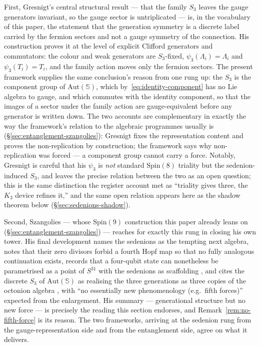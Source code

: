 First, Gresnigt's central structural result --- that the family $S_3$ leaves the gauge generators
invariant, so the gauge sector is untriplicated --- is, in the vocabulary of this paper, the
statement that the generation symmetry is a discrete label carried by the fermion sectors and not a
gauge symmetry of the connection. His construction proves it at the level of explicit Clifford
generators and commutators: the colour and weak generators are $S_3$-fixed, $\psi_3(\Lambda_i) =
\Lambda_i$ and $\psi_3(T_i) = T_i$, and the family action moves only the fermion sectors. The present
framework supplies the same conclusion's reason from one rung up: the $S_3$ is the component group of
$\mathrm{Aut}(\mathbb{S})$, which by~\eqref{eq:identity-component} has no Lie algebra to gauge, and
which commutes with the identity component, so that the images of a sector under the family action
are gauge-equivalent before any generator is written down. The
two accounts are complementary in exactly the way the framework's relation to the algebraic programmes
usually is (\S\ref{sec:entanglement-szangolies}): Gresnigt fixes the representation content and proves
the non-replication by construction; the framework says why non-replication was forced --- a component
group cannot carry a force. Notably, Gresnigt is careful that his $\psi_3$ is \emph{not} standard
$\mathrm{Spin}(8)$ triality but the sedenion-induced $S_3$, and leaves the precise relation between
the two as an open question; this is the same distinction the register account met as ``triality
gives three, the $K_3$ device refines it,'' and the same open relation appears here as the shadow
theorem below (\S\ref{sec:sedenions-shadow}).

Second, Szangolies --- whose $\mathrm{Spin}(9)$ construction this paper already leans on
(\S\ref{sec:entanglement-szangolies}) --- reaches for exactly this rung in closing his own tower. His
final development names the sedenions as the tempting next algebra, notes that their zero divisors
forbid a fourth Hopf map so that no fully analogous continuation exists, records that a four-qubit
state can nonetheless be parametrised as a point of $S^{31}$ with the sedenions as scaffolding
\autocite{pinillaluthra2009hopf}, and cites the discrete $S_3$ of $\mathrm{Aut}(\mathbb{S})$ as
realising the three generations as three copies of the octonion algebra
\autocite{gresnigtgourlayvarma2023three,gourlaygresnigt2024algebraic,tangtang2023unified}, with
``no essentially new phenomenology (e.g.\ fifth forces)'' expected from the enlargement. His summary
--- generational structure but no new force --- is precisely the reading this section endorses, and
Remark~\ref{rem:no-fifth-force} is its reason. The two frameworks, arriving at the sedenion rung from
the gauge-representation side and from the entanglement side, agree on what it delivers.

